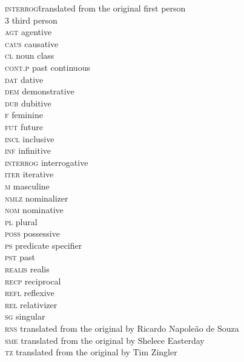 \addchap{\lsAbbreviationsTitle} 
\begin{tabbing}
\textsc{interrog}\hspace{1em}\= translated from the original                 \> first person\\
3                 \> third person\\
\textsc{agt}      \> agentive\\
\textsc{caus}     \> causative\\
\textsc{cl}       \> noun class\\
\textsc{cont.p}   \> past continuous\\
\textsc{dat}      \> dative\\
\textsc{dem}      \> demonstrative\\
\textsc{dub}      \> dubitive\\
\textsc{f}        \> feminine\\
\textsc{fut}      \> future\\
\textsc{incl}     \> inclusive\\
\textsc{inf}      \> infinitive\\
\textsc{interrog} \> interrogative\\
\textsc{iter}     \> iterative\\
\textsc{m}        \> masculine\\
\textsc{nmlz}     \> nominalizer\\
\textsc{nom}      \> nominative\\
\textsc{pl}       \> plural\\
\textsc{poss}     \> possessive\\
\textsc{ps}       \> predicate specifier\\
\textsc{pst}      \> past\\
\textsc{realis}   \> realis\\
\textsc{recp}     \> reciprocal\\
\textsc{refl}     \> reflexive\\
\textsc{rel}      \> relativizer\\
\textsc{sg}       \> singular\\
\textsc{rns}      \> translated from the original by Ricardo Napoleão de Souza\\
\textsc{sme}      \> translated from the original by Shelece Easterday\\
\textsc{tz}       \> translated from the original by Tim Zingler\\
\end{tabbing}
